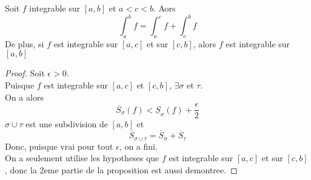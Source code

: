 \documentclass[../main.tex]{subfiles}
\begin{document}
\begin{propo}
	Soit $f$ integrable sur $[a,b]$ et $a<c<b.$ Aors
	\[ 
	\int_{ a }^{ b }f = \int_{ a }^{ c }f + \int_{ c }^{ b }f
	\]
	De plus, si $f$ est integrable sur $[a,c]$ et sur $[c,b]$, alors $f$ est integrable sur $[a,b]$
\end{propo}
\begin{proof}
Soit $\epsilon>0$.\\
Puisque $f$ est integrable sur $[a,c]$ et $[c,b]$, $\exists  \sigma$ et $\tau$.\\
On a alors
\[ 
	\overline{S}_\sigma( f) < \underline{S}_\sigma( f) + \frac{\epsilon}{2}
\]
$\sigma\cup\tau$ est une subdivision de $[a,b]$ et
\[ 
	\overline{S}_{\sigma\cup\tau} = \overline{S}_\sigma + \overline{S}_\tau
\]
Donc, puisque vrai pour tout $\epsilon$, on a fini.\\
On a seulement utilise les hypotheses que $f$ est integrable sur $[a,c]$ et sur $[c,b]$, donc la 2eme partie de la proposition est aussi demontree.	
\end{proof}
\end{document}

